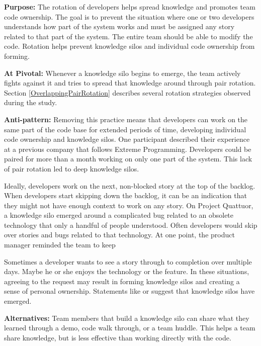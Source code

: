 \textbf{Purpose:} The rotation of developers helps spread knowledge and promotes team code ownership. The goal is to prevent the situation where one or two developers understands how  part of the system works and must be assigned any story related to that part of the system. The entire team should be able to modify the code. Rotation helps prevent knowledge silos and individual code ownership from forming. 

\textbf{At Pivotal:} Whenever a knowledge silo begins to emerge, the team actively fights against it and tries to spread that knowledge around through pair rotation. Section \ref{OverlappingPairRotation} describes several rotation strategies observed during the study.

\textbf{Anti-pattern:} Removing this practice means that developers can work on the same part of the code base for extended periods of time, developing individual code ownership and knowledge silos. One participant described their experience at a previous company that follows Extreme Programming. Developers could be paired for more than a month working on only one part of the system. This lack of pair rotation led to deep knowledge silos. 

Ideally, developers work on the next, non-blocked story at the top of the backlog. When developers start skipping down the backlog, it can be an indication that they might not have enough context to work on any story. On Project Quattuor, a knowledge silo emerged around a complicated bug related to an obsolete technology that only a handful of people understood. Often developers would skip over stories and bugs related to that technology. At one point, the product manager reminded the team to keep 

Sometimes a developer wants to see a story through to completion over multiple days. Maybe he or she enjoys the technology or the feature. In these situations, agreeing to the request may result in forming knowledge silos and creating a sense of personal ownership. Statements like  or  suggest that knowledge silos have emerged. 

\textbf{Alternatives:} Team members that build a knowledge silo can share what they learned through a demo, code walk through, or a team huddle. This helps a team share knowledge, but is less effective than working directly with the code. 

